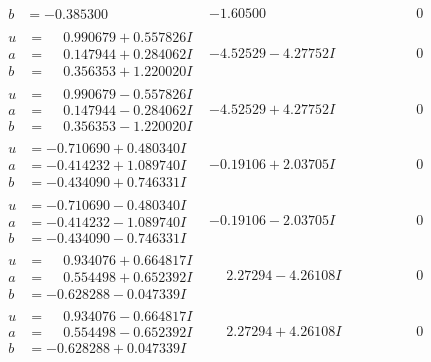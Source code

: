 \documentclass[1p]{elsarticle_modified}
\theoremstyle{definition}
\begin{document}
$$\begin{array}{c|c|c}
\begin{aligned}
b &= -0.385300\phantom{ +0.000000I}\end{aligned}
 & -1.60500\phantom{ +0.000000I} & \phantom{-0.000000 } 0 \\ \hline\begin{aligned}
u &= \phantom{-}0.990679 + 0.557826 I \\
a &= \phantom{-}0.147944 + 0.284062 I \\
b &= \phantom{-}0.356353 + 1.220020 I\end{aligned}
 & -4.52529 - 4.27752 I & \phantom{-0.000000 } 0 \\ \hline\begin{aligned}
u &= \phantom{-}0.990679 - 0.557826 I \\
a &= \phantom{-}0.147944 - 0.284062 I \\
b &= \phantom{-}0.356353 - 1.220020 I\end{aligned}
 & -4.52529 + 4.27752 I & \phantom{-0.000000 } 0 \\ \hline\begin{aligned}
u &= -0.710690 + 0.480340 I \\
a &= -0.414232 + 1.089740 I \\
b &= -0.434090 + 0.746331 I\end{aligned}
 & -0.19106 + 2.03705 I & \phantom{-0.000000 } 0 \\ \hline\begin{aligned}
u &= -0.710690 - 0.480340 I \\
a &= -0.414232 - 1.089740 I \\
b &= -0.434090 - 0.746331 I\end{aligned}
 & -0.19106 - 2.03705 I & \phantom{-0.000000 } 0 \\ \hline\begin{aligned}
u &= \phantom{-}0.934076 + 0.664817 I \\
a &= \phantom{-}0.554498 + 0.652392 I \\
b &= -0.628288 - 0.047339 I\end{aligned}
 & \phantom{-}2.27294 - 4.26108 I & \phantom{-0.000000 } 0 \\ \hline\begin{aligned}
u &= \phantom{-}0.934076 - 0.664817 I \\
a &= \phantom{-}0.554498 - 0.652392 I \\
b &= -0.628288 + 0.047339 I\end{aligned}
 & \phantom{-}2.27294 + 4.26108 I & \phantom{-0.000000 } 0 \\ \hline\begin{aligned}

\end{aligned}
\end{array}$$
\end{document}
